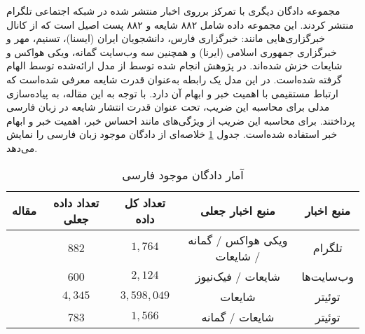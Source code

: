 \citet{jahanbakhsh2020model}  مجموعه دادگان دیگری با تمرکز برروی اخبار منتشر شده در شبکه‌ اجتماعی تلگرام منتشر کردند. این مجموعه داده شامل ۸۸۲ شایعه و ۸۸۲ پست اصیل است که از کانال‌ خبرگزاری‌هایی مانند: خبرگزاری فارس، دانشجویان ایران (ایسنا)، تسنیم، مهر و خبرگزاری جمهوری اسلامی (ایرنا) و همچنین سه وب‌سایت گمانه، ویکی هواکس و شایعات خزش شده‌اند.
% 
در پژوهش انجام شده توسط 
\citet{jahanbakhsh2020model} 
از مدل ارائه‌شده توسط 
\citet{allport1947psychology}
الهام گرفته شده‌است. در این مدل  یک رابطه به‌عنوان قدرت شایعه معرفی شده‌است  که ارتباط مستقیمی با اهمیت خبر و ابهام آن دارد. با توجه به این مقاله، 
\citet{jahanbakhsh2020model} 
به پیاده‌سازی مدلی برای محاسبه این ضریب، تحت عنوان قدرت انتشار شایعه در زبان فارسی پرداختند. برای محاسبه این ضریب از ویژگی‌های مانند احساس خبر، اهمیت خبر و ابهام خبر استفاده شده‌است.
جدول \ref{table.other_datasets} خلاصه‌ای از دادگان موجود زبان فارسی را نمایش می‌دهد.

\begin{table}[!h]
	\caption{آمار دادگان موجود فارسی}
	\label{table.other_datasets}
	\normalsize
	\begin{center}
		\begin{tabular}{|c|c|c|c|c|}
			\hline
			مقاله & تعداد داده جعلی & تعداد کل داده & منبع اخبار جعلی & منبع اخبار \\
			\hline
			\hline
			\cite{jahanbakhsh2020model} & 
			882 & $1,764$ & ویکی هواکس / گمانه / شایعات & تلگرام \\
			\hline
			\cite{zarharan2019persian} & 
			600 & $2,124$ & شایعات / فیک‌نیوز & وب‌سایت‌ها \\
			\hline
			\cite{mahmoodabad2018persian} & 
			$4,345$ & $3,598,049$ & شایعات & توئیتر \\
			\hline
			\cite{zamani2017rumor} & 
			783 & $1,566$ & شایعات / گمانه & توئیتر \\
			\hline
			
		\end{tabular}
	\end{center}
\end{table}